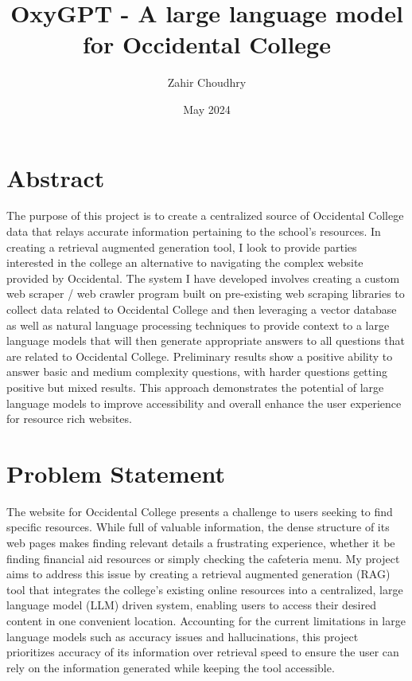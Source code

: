 \documentclass[10pt,twocolumn]{article}
\title{OxyGPT - A large language model for Occidental College}
\author{Zahir Choudhry}
\affiliation{Occidental College}
\date{May 2024}
\begin{document}
\maketitle

\section{Abstract}
The purpose of this project is to create a centralized source of Occidental College data that relays accurate information pertaining to the school's resources. In creating a retrieval augmented generation tool, I look to provide parties interested in the college an alternative to navigating the complex website provided by Occidental. The system I have developed involves creating a custom web scraper / web crawler program built on pre-existing web scraping libraries to collect data related to Occidental College and then leveraging a vector database as well as natural language processing techniques to provide context to a large language models that will then generate appropriate answers to all questions that are related to Occidental College. Preliminary results show a positive ability to answer basic and medium complexity questions, with harder questions getting positive but mixed results. This approach demonstrates the potential of large language models to improve accessibility and overall enhance the user experience for resource rich websites. 

\section{Problem Statement}
The website for Occidental College presents a challenge to users seeking to find specific resources. While full of valuable information, the dense structure of its web pages makes finding relevant details a frustrating experience, whether it be finding financial aid resources or simply checking the cafeteria menu. My project aims to address this issue by creating a retrieval augmented generation (RAG) tool that integrates the college’s existing online resources into a centralized, large language model (LLM) driven system, enabling users to access their desired content in one convenient location. Accounting for the current limitations \cite{lakera_hallucinations_llms} in large language models such as accuracy issues and hallucinations, this project prioritizes accuracy of its information over retrieval speed to ensure the user can rely on the information generated while keeping the tool accessible.
\vspace{20pt}
\end{document}
